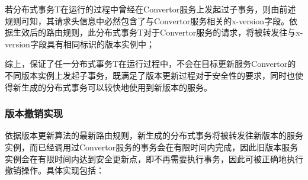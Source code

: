 \documentclass[macfonts,master]{njuthesis}
\begin{document}
若分布式事务T在运行的过程中曾经在Convertor服务上发起过子事务，则由前述规则可知，其请求头信息中必然包含了与Convertor服务相关的x-version字段。依据生效后的路由规则，此分布式事务T对于Convertor服务的请求，将被转发往与x-version字段具有相同标识的版本实例中；

综上，保证了任一分布式事务T在运行过程中，不会在目标更新服务Convertor的不同版本实例上发起子事务，既满足了版本更新过程对于安全性的要求，同时也使得新生成的分布式事务可以较快地使用到新版本的服务。

\subsubsection{版本撤销实现}
依据版本更新算法的最新路由规则，新生成的分布式事务将被转发往新版本的服务实例，而已经调用过Convertor服务的事务会在有限时间内完成，因此旧版本服务实例会在有限时间内达到安全更新点，即不再需要执行事务，因此可被正确地执行撤销操作。具体实现包括：
\end{document}
